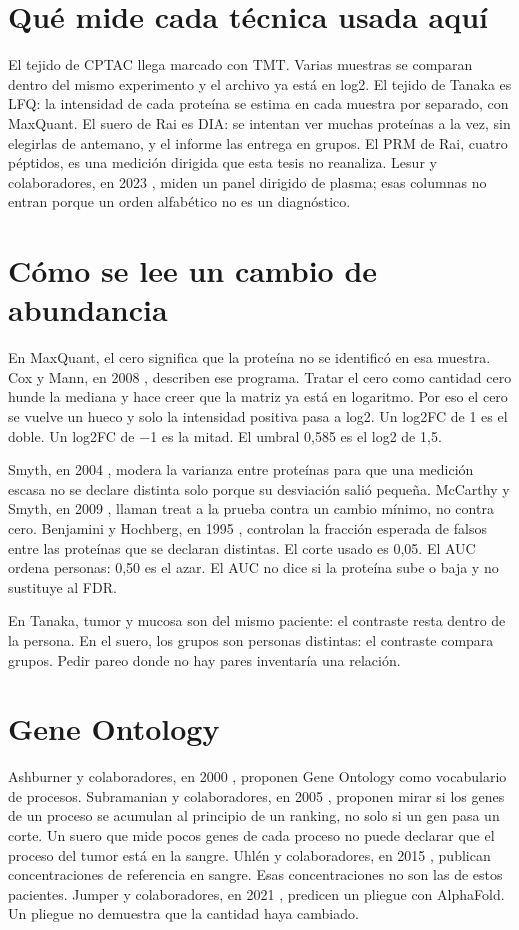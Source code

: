 \documentclass[12pt,oneside]{report}
\begin{document}
\section{Qué mide cada técnica usada aquí}
El tejido de CPTAC llega marcado con TMT. Varias muestras se comparan dentro del mismo experimento y el archivo ya está en log2. El tejido de Tanaka es LFQ: la intensidad de cada proteína se estima en cada muestra por separado, con MaxQuant. El suero de Rai es DIA: se intentan ver muchas proteínas a la vez, sin elegirlas de antemano, y el informe las entrega en grupos. El PRM de Rai, cuatro péptidos, es una medición dirigida que esta tesis no reanaliza. Lesur y colaboradores, en 2023 \cite{lesur2023}, miden un panel dirigido de plasma; esas columnas no entran porque un orden alfabético no es un diagnóstico.

\section{Cómo se lee un cambio de abundancia}
En MaxQuant, el cero significa que la proteína no se identificó en esa muestra. Cox y Mann, en 2008 \cite{cox2008}, describen ese programa. Tratar el cero como cantidad cero hunde la mediana y hace creer que la matriz ya está en logaritmo. Por eso el cero se vuelve un hueco y solo la intensidad positiva pasa a log2. Un log2FC de 1 es el doble. Un log2FC de −1 es la mitad. El umbral 0,585 es el log2 de 1,5.

Smyth, en 2004 \cite{smyth2004}, modera la varianza entre proteínas para que una medición escasa no se declare distinta solo porque su desviación salió pequeña. McCarthy y Smyth, en 2009 \cite{mccarthy2009}, llaman treat a la prueba contra un cambio mínimo, no contra cero. Benjamini y Hochberg, en 1995 \cite{benjamini1995}, controlan la fracción esperada de falsos entre las proteínas que se declaran distintas. El corte usado es 0,05. El AUC ordena personas: 0,50 es el azar. El AUC no dice si la proteína sube o baja y no sustituye al FDR.

En Tanaka, tumor y mucosa son del mismo paciente: el contraste resta dentro de la persona. En el suero, los grupos son personas distintas: el contraste compara grupos. Pedir pareo donde no hay pares inventaría una relación.

\section{Gene Ontology}
Ashburner y colaboradores, en 2000 \cite{ashburner2000}, proponen Gene Ontology como vocabulario de procesos. Subramanian y colaboradores, en 2005 \cite{subramanian2005}, proponen mirar si los genes de un proceso se acumulan al principio de un ranking, no solo si un gen pasa un corte. Un suero que mide pocos genes de cada proceso no puede declarar que el proceso del tumor está en la sangre. Uhlén y colaboradores, en 2015 \cite{uhlen2015}, publican concentraciones de referencia en sangre. Esas concentraciones no son las de estos pacientes. Jumper y colaboradores, en 2021 \cite{jumper2021}, predicen un pliegue con AlphaFold. Un pliegue no demuestra que la cantidad haya cambiado.
\end{document}

